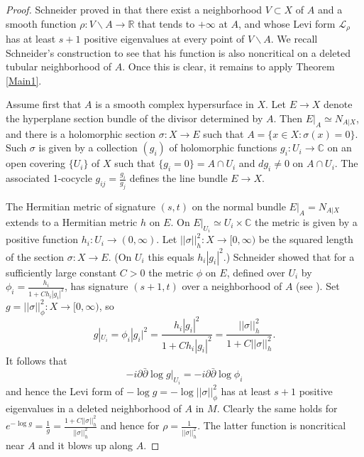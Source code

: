\documentclass[11pt]{amsart}
\numberwithin{equation}{section}
\theoremstyle{definition}
\begin{document}
\begin{proof} 
Schneider proved in \cite{Schneider} that there exist a 
neighborhood $V\subset X$ of $A$ and a smooth
function $\rho\colon V{\backslash} A \to {\mathbb{R}}$ that tends to $+\infty$ 
at $A$, and whose Levi form ${\mathcal{L}}_\rho$ has at least 
$s+1$ positive eigenvalues at every point of $V{\backslash} A$. 
We recall Schneider's construction to see that his function
is also noncritical on a deleted tubular neighborhood of $A$.
Once this is clear, it remains to apply Theorem \ref{Main1}.

Assume first that $A$ is a smooth complex hypersurface in $X$.
Let $E\to X$ denote the hyperplane section bundle of the divisor 
determined by $A$. Then $E|_A\simeq N_{A|X}$, and there is a holomorphic section
$\sigma \colon X\to E$ such that $A=\{x\in X\colon \sigma(x)=0\}$.
Such $\sigma$ is given by a collection $(g_i)$ of holomorphic 
functions $g_i\colon U_i\to{\mathbb{C}}$ on an open covering $\{U_i\}$ of $X$ 
such that $\{g_i=0\}=A\cap U_i$ and
$dg_i\ne 0$ on $A\cap U_i$. The associated 1-cocycle 
$g_{ij}=\frac{g_i}{g_j}$ defines the line bundle $E\to X$.

The Hermitian metric of signature $(s,t)$ on the normal bundle 
$E|_A= N_{A|X}$ extends to a Hermitian metric $h$ on $E$. 
On $E|_{U_i}\simeq U_i\times {\mathbb{C}}$ the metric is given  
by a positive function $h_i \colon U_i \to (0,\infty)$.
Let $||\sigma||_h^2 \colon X\to[0,\infty)$ be the squared length 
of the section $\sigma\colon X\to E$.
(On $U_i$ this equals $h_i|g_i|^2$.) Schneider showed that for 
a sufficiently large constant $C>0$ the metric $\phi$ on $E$, 
defined over $U_i$ by $\phi_i=\frac{h_i}{1+Ch_i|g_i|^2}$,
has signature $(s+1,t)$ over a neighborhood of $A$
(see \cite[p.\ 225]{Schneider}). 
Set $g=||\sigma||^2_\phi \colon X\to [0,\infty)$,  so 
\[
	g|_{U_i} = \phi_i |g_i|^2 = \frac{h_i|g_i|^2}{1+Ch_i|g_i|^2}
	=\frac{||\sigma||_h^2}{1+C||\sigma||_h^2}.
\]
It follows that
\[
	-i{\partial}{\bar\partial} \log g|_{U_i} =  -i{\partial}{\bar\partial} \log \phi_i  
\]
and hence the Levi form of $-\log g= -\log ||\sigma||^2_\phi$ 
has at least $s+1$ positive eigenvalues in a deleted neighborhood 
of $A$ in $M$. Clearly the same holds for 
$e^{-\log g}=\frac{1}{g}= \frac{1+C||\sigma||_h^2}{||\sigma||_h^2}$
and hence for $\rho = \frac{1}{||\sigma||_h^2}$. The latter function is 
noncritical near $A$ and it blows up along $A$.


\end{proof}
\end{document}
